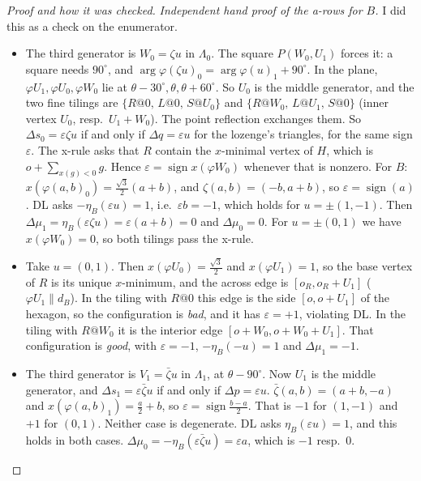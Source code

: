\documentclass[11pt]{article}
\theoremstyle{definition}\newtheorem{definition}[theorem]{Definition}\newtheorem{remark}[theorem]{Remark}
\begin{document}
\begin{proof}[Proof and how it was checked]
\emph{Independent hand proof of the a-rows for $B$.} I did this as a check on the enumerator.
\begin{itemize}
\item[a0.] The third generator is $W_0=\zeta u$ in $\Lambda_0$. The square $P(W_0,U_1)$ forces it: a square needs $90^\circ$, and $\arg\varphi(\zeta u)_0=\arg\varphi(u)_1+90^\circ$.
In the plane, $\varphi U_1,\varphi U_0,\varphi W_0$ lie at $\theta-30^\circ,\theta,\theta+60^\circ$. So $U_0$ is the middle generator, and the two fine tilings are $\{R@0,\,L@0,\,S@U_0\}$ and $\{R@W_0,\,L@U_1,\,S@0\}$ (inner vertex $U_0$, resp.\ $U_1+W_0$).
The point reflection exchanges them. So $\Delta s_0=\varepsilon\zeta u$ if and only if $\Delta q=\varepsilon u$ for the lozenge's triangles, for the same sign $\varepsilon$.
The x-rule asks that $R$ contain the $x$-minimal vertex of $H$, which is $o+\sum_{x(g)<0}g$. Hence $\varepsilon=\operatorname{sign}x(\varphi W_0)$ whenever that is nonzero.
For $B$: $x(\varphi(a,b)_0)=\tfrac{\sqrt3}2(a+b)$, and $\zeta(a,b)=(-b,a+b)$, so $\varepsilon=\operatorname{sign}(a)$. DL asks $-\eta_B(\varepsilon u)=1$, i.e.\ $\varepsilon b=-1$, which holds for $u=\pm(1,-1)$.
Then $\Delta\mu_1=\eta_B(\varepsilon\zeta u)=\varepsilon(a+b)=0$ and $\Delta\mu_0=0$.
For $u=\pm(0,1)$ we have $x(\varphi W_0)=0$, so both tilings pass the x-rule.
\item[Tie-break.] Take $u=(0,1)$. Then $x(\varphi U_0)=\tfrac{\sqrt3}2$ and $x(\varphi U_1)=1$, so the base vertex of $R$ is its unique $x$-minimum, and the across edge is $[o_R,o_R+U_1]$ ($\varphi U_1\parallel d_B$).
In the tiling with $R@0$ this edge is the side $[o,o+U_1]$ of the hexagon, so the configuration is \emph{bad}, and it has $\varepsilon=+1$, violating DL.
In the tiling with $R@W_0$ it is the interior edge $[o+W_0,o+W_0+U_1]$. That configuration is \emph{good}, with $\varepsilon=-1$, $-\eta_B(-u)=1$ and $\Delta\mu_1=-1$.
\item[a1.] The third generator is $V_1=\bar\zeta u$ in $\Lambda_1$, at $\theta-90^\circ$. Now $U_1$ is the middle generator, and $\Delta s_1=\varepsilon\bar\zeta u$ if and only if $\Delta p=\varepsilon u$.
$\bar\zeta(a,b)=(a+b,-a)$ and $x(\varphi(a,b)_1)=\tfrac a2+b$, so $\varepsilon=\operatorname{sign}\tfrac{b-a}2$. That is $-1$ for $(1,-1)$ and $+1$ for $(0,1)$. Neither case is degenerate.
DL asks $\eta_B(\varepsilon u)=1$, and this holds in both cases. $\Delta\mu_0=-\eta_B(\varepsilon\bar\zeta u)=\varepsilon a$, which is $-1$ resp.\ $0$.
\end{itemize}
\begin{itemize}

\end{itemize}
\end{proof}
\end{document}
